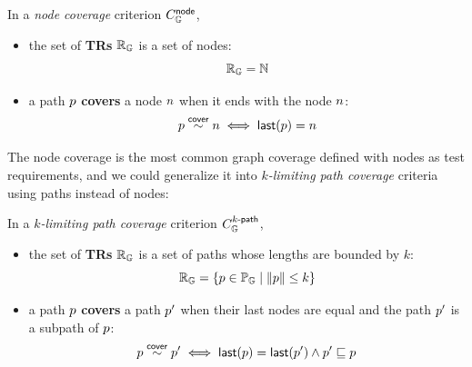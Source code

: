 
\begin{definition}\label{def:node-cov} In a \textit{node
  coverage} criterion $C_{\mathbb{G}}^{\textsf{node}}$,
  \begin{itemize}
    \item the set of \textbf{TRs} $\mathbb{R}_{\mathbb{G}}$ is a set of nodes:
      \[
        \mathbb{R}_{\mathbb{G}} = \mathbb{N}
      \]
    \item a path $p$ \textbf{covers} a node $n$ when it ends with the
      node $n$:
      \[
        p \overset{\textsf{cover}}{\sim} n \iff \textsf{last}(p) = n
      \]
  \end{itemize}
\end{definition}


The node coverage is the most common graph coverage defined with nodes as test
requirements, and we could generalize it into \textit{$k$-limiting path
coverage} criteria using paths instead of nodes:


\begin{definition}\label{def:k-path-cov}
  In a \textit{$k$-limiting path coverage} criterion $C_{\mathbb{G}}^{{k}\textsf{-path}}$,
  \begin{itemize}
    \item the set of \textbf{TRs} $\mathbb{R}_{\mathbb{G}}$ is a set of
      paths whose lengths are bounded by $k$:
      \[
        \mathbb{R}_{\mathbb{G}} = \{ p \in \mathbb{P}_{\mathbb{G}} \mid \lVert{p}\rVert \leq k \}
      \]
    \item a path $p$ \textbf{covers} a path $p'$ when their last nodes are
      equal and the path $p'$ is a subpath of $p$:
      \[
        p \overset{\textsf{cover}}{\sim} p'
        \iff
        \textsf{last}(p) = \textsf{last}(p') \wedge p' \sqsubseteq p
      \]
  \end{itemize}
\end{definition}



